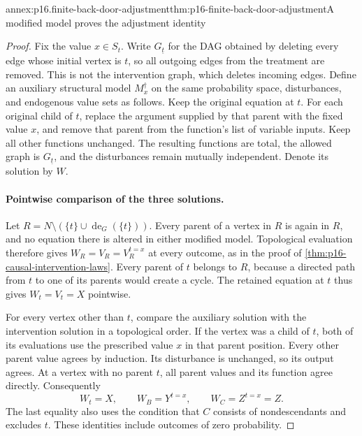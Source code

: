 \begin{annexitem}{annex:p16.finite-back-door-adjustment}{thm:p16-finite-back-door-adjustment}{A modified model proves the adjustment identity}
\begin{proof}
Fix the value \(x\in S_t\). Write \(G_{\underline t}\) for the
DAG obtained by deleting every edge whose initial vertex is \(t\),
so all outgoing edges from the treatment are removed. This is not
the intervention graph, which deletes incoming edges. Define an
auxiliary structural model \(M_x^\dagger\) on the same probability
space, disturbances, and endogenous value sets as follows.
Keep the original equation at \(t\). For each original child of
\(t\), replace the argument supplied by that parent with the fixed
value \(x\), and remove that parent from the function's list of
variable inputs. Keep all other functions unchanged. The resulting
functions are total, the allowed graph is \(G_{\underline t}\),
and the disturbances remain mutually independent. Denote its solution
by \(W\).

\paragraph{Pointwise comparison of the three solutions.}
Let \(R=N\setminus(\{t\}\cup\operatorname{de}_G(\{t\}))\).
Every parent of a vertex in \(R\) is again in \(R\), and no
equation there is altered in either modified model. Topological
evaluation therefore gives
\(W_R=V_R=V_R^{t=x}\) at every outcome, as in the proof of
\cref{thm:p16-causal-intervention-laws}. Every parent of \(t\)
belongs to \(R\), because a directed path from \(t\) to one of
its parents would create a cycle. The retained equation at \(t\)
thus gives \(W_t=V_t=X\) pointwise.

For every vertex other than \(t\), compare the auxiliary solution
with the intervention solution in a topological order. If the vertex
was a child of \(t\), both of its evaluations use the prescribed
value \(x\) in that parent position. Every other parent value agrees
by induction. Its disturbance is unchanged, so its output agrees.
At a vertex with no parent \(t\), all parent values and its function
agree directly. Consequently
\[
 W_t=X,\qquad W_B=Y^{t=x},\qquad W_C=Z^{t=x}=Z.
\]
The last equality also uses the condition that \(C\) consists of
nondescendants and excludes \(t\). These identities include outcomes
of zero probability.


\end{proof}
\end{annexitem}
